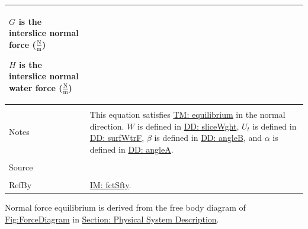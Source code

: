 \documentclass[12pt]{article}
\begin{document}
\begin{minipage}{\textwidth}
\begin{tabular}{p{} p{}}
\begin{symbDescription}
                                         \item{$G$ is the interslice normal force ($\frac{\text{N}}{\text{m}}$)}
                                         \item{$H$ is the interslice normal water force  ($\frac{\text{N}}{\text{m}}$)}
                                         \end{symbDescription}
                                         \\ \midrule \\
                                         Notes & This equation satisfies \hyperref[TM:equilibrium]{TM: equilibrium} in the normal direction. $W$ is defined in \hyperref[DD:sliceWght]{DD: sliceWght}, ${U_{t}}$ is defined in \hyperref[DD:surfWtrF]{DD: surfWtrF}, $β$ is defined in \hyperref[DD:angleB]{DD: angleB}, and $α$ is defined in \hyperref[DD:angleA]{DD: angleA}.
                                                 \\ \midrule \\
                                                 Source & \cite{chen2005}
                                                          \\ \midrule \\
                                                          RefBy & \hyperref[IM:fctSfty]{IM: fctSfty}.
\\ \bottomrule \end{tabular}
\end{minipage}
Normal force equilibrium is derived from the free body diagram of \hyperref[Figure:ForceDiagram]{Fig:ForceDiagram} in \hyperref[Sec:PhysSyst]{Section: Physical System Description}.
\par~
\end{document}
